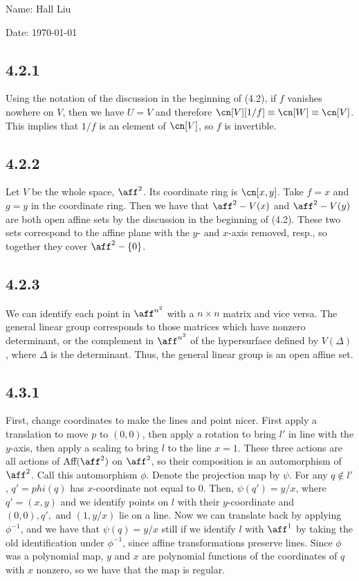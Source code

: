 \documentclass{article}
\begin{document}
Name: Hall Liu

Date: \today 
\vspace{1.5cm}
\subsection*{4.2.1}
Using the notation of the discussion in the beginning of (4.2), if $f$ vanishes nowhere on $V$, then we have $U=V$ and therefore $\cn[V][1/f]\equiv\cn[W]\equiv\cn[V]$. This implies that $1/f$ is an element of $\cn[V]$, so $f$ is invertible.
\subsection*{4.2.2}
Let $V$ be the whole space, $\aff^2$. Its coordinate ring is $\cn[x,y]$. Take $f=x$ and $g=y$ in the coordinate ring. Then we have that $\aff^2-V(x)$ and $\aff^2-V(y)$ are both open affine sets by the discussion in the beginning of (4.2). These two sets correspond to the affine plane with the $y$- and $x$-axis removed, resp., so together they cover $\aff^2-\{0\}$.
\subsection*{4.2.3}
We can identify each point in $\aff^{n^2}$ with a $n\times n$ matrix and vice versa. The general linear group corresponds to those matrices which have nonzero determinant, or the complement in $\aff^{n^2}$ of the hypersurface defined by $V(\Delta)$, where $\Delta$ is the determinant. Thus, the general linear group is an open affine set.
\subsection*{4.3.1}
First, change coordinates to make the lines and point nicer. First apply a translation to move $p$ to $(0,0)$, then apply a rotation to bring $l'$ in line with the $y$-axis, then apply a scaling to bring $l$ to the line $x=1$. These three actions are all actions of $\text{Aff}(\aff^2)$ on $\aff^2$, so their composition is an automorphism of $\aff^2$. Call this automorphism $\phi$. Denote the projection map by $\psi$. For any $q\not\in l'$, $q'=phi(q)$ has $x$-coordinate not equal to $0$. Then, $\psi(q')=y/x$, where $q'=(x,y)$ and we identify points on $l$ with their $y$-coordinate and $(0,0),q',\text{ and }(1,y/x)$ lie on a line. Now we can translate back by applying $\phi^{-1}$, and we have that $\psi(q)=y/x$ still if we identify $l$ with $\aff^1$ by taking the old identification under $\phi^{-1}$, since affine transformations preserve lines. Since $\phi$ was a polynomial map, $y$ and $x$ are polynomial functions of the coordinates of $q$ with $x$ nonzero, so we have that the map is regular.
\end{document}
